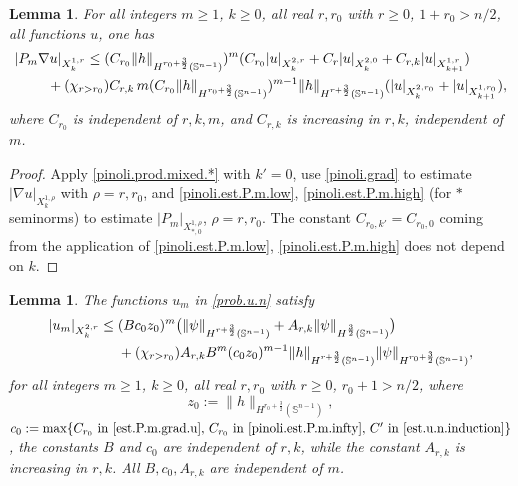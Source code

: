 \documentclass[10pt,reqno,a4paper]{article}
\numberwithin{equation}{section}
\theoremstyle{plain}
\newtheorem{lemma}[theorem]{Lemma}
\theoremstyle{definition}
\renewcommand{\S}{{\mathbb S}}
\newcommand{\grad}{\nabla}
\begin{document}
\begin{lemma}
For all integers $m \geq 1$, $k \geq 0$, all real $r,r_0$ with $r \geq 0$, $1+r_0 > n/2$, 
all functions $u$, one has 
\begin{align} 
& |P_m \grad u|_{X^{1,r}_k} 
\leq  (C_{r_0} \| h \|_{H^{r_0+\frac32}(\S^{n-1})} )^m
(C_{r_0} |u|_{X^{2,r}_k} + C_r |u|_{X^{2,0}_k} + C_{r,k} |u|_{X^{1,r}_{k+1}}) 
\notag \\ 
& \qquad \ 
+ (\chi_{r>r_0}) C_{r,k} \, m (C_{r_0} \| h \|_{H^{r_0+\frac32}(\S^{n-1})} )^{m-1} 
\| h \|_{H^{r+\frac32}(\S^{n-1})} (|u|_{X^{2,r_0}_k} + |u|_{X^{1,r_0}_{k+1}}),
\label{est.P.m.grad.u}
\end{align}
where $C_{r_0}$ is independent of $r,k,m$, 
and $C_{r,k}$ is increasing in $r,k$, independent of $m$. 
\end{lemma}

\begin{proof}
Apply \eqref{pinoli.prod.mixed.*} with $k' = 0$, 
use \eqref{pinoli.grad} to estimate $|\grad u|_{X^{1,\rho}_k}$ with $\rho =r, r_0$, 
and \eqref{pinoli.est.P.m.low}, \eqref{pinoli.est.P.m.high} 
(for $*$ seminorms) to estimate $|P_m|_{X^{1,\rho}_{*,0}}$, $\rho = r, r_0$. 
The constant $C_{r_0,k'} = C_{r_0,0}$ 
coming from the application of \eqref{pinoli.est.P.m.low}, \eqref{pinoli.est.P.m.high} 
does not depend on $k$. 
\end{proof}



\begin{lemma} \label{lemma:est.u.n.r.k}
The functions $u_m$ in \eqref{prob.u.n} satisfy 
\begin{align} 
|u_m|_{X^{2,r}_k} 
& \leq ( B c_0 z_0 )^m
\big( \| \psi \|_{H^{r+\frac32}(\S^{n-1})} + A_{r,k} \| \psi \|_{H^{\frac32}(\S^{n-1})} \big)  
\notag \\ & \quad \ 
+ (\chi_{r > r_0}) A_{r,k} B^m ( c_0 z_0 )^{m-1} 
\| h \|_{H^{r+\frac32}(\S^{n-1})} \| \psi \|_{H^{r_0+\frac32}(\S^{n-1})},
\label{echin.45}
\end{align}
for all integers $m \geq 1$, $k \geq 0$, 
all real $r, r_0$ with $r \geq 0$, $r_0 + 1 > n/2$, 
where
\[
z_0 := \| h \|_{H^{r_0+\frac32}(\S^{n-1})}, 
\]
$c_0 := \max \{ \text{$C_{r_0}$ in \eqref{est.P.m.grad.u}, 
$C_{r_0}$ in \eqref{pinoli.est.P.m.infty}, 
$C'$ in \eqref{est.u.n.induction}} \}$,
the constants $B$ and $c_0$ are independent of $r,k$, 
while the constant $A_{r,k}$ is increasing in $r,k$. 
All $B,c_0,A_{r,k}$ are independent of $m$.
\end{lemma}
\end{document}
